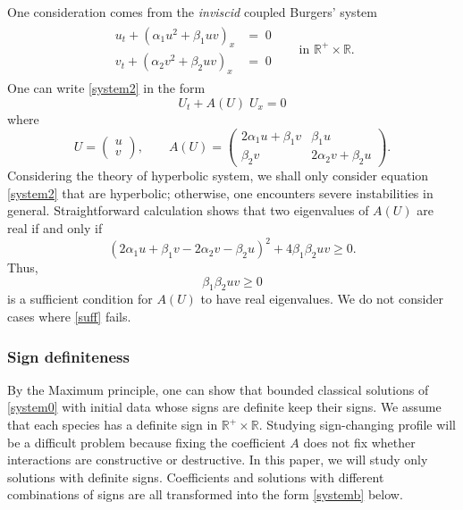 \documentclass{amsart}
\theoremstyle{definition}
\numberwithin{equation}{section}
\begin{document}
One consideration comes from the {\it inviscid} coupled Burgers' system
\begin{align}\label{system2} 
\begin{aligned}
u_{t} + ( \alpha_{1}u^{2} + \beta_{1}uv )_{x} &= \; 0 \\
v_{t} + ( \alpha_{2}v^{2} + \beta_{2}uv )_{x} &= \; 0 
\end{aligned} \quad &\text{in $\mathbb{R}^+\times \mathbb{R}$}.
\end{align}
One can write \eqref{system2} in the form
\begin{equation*}%
U_{t} +
A(U) \; U_{x}=0
\end{equation*}
where
\begin{equation*}
U = \begin{pmatrix}
u \\
v
\end{pmatrix}, \quad \quad
A(U) =
\begin{pmatrix}
2\alpha_{1}u+\beta_{1}v & \beta_{1}u \\
\beta_{2}v & 2\alpha_{2}v + \beta_{2}u
\end{pmatrix}.
\end{equation*}
Considering the theory of hyperbolic system, we shall only consider equation \eqref{system2} that are hyperbolic; otherwise, one encounters severe instabilities in general. Straightforward calculation shows that two eigenvalues of $A(U)$ are real if and only if
$$ (2\alpha_1u + \beta_1v - 2\alpha_2v - \beta_2u)^2 + 4 \beta_1\beta_2uv \ge 0.$$
Thus, 
\begin{equation} \label{suff} \tag{S}
\beta_1\beta_2uv \ge 0 
\end{equation}
is a sufficient condition for $A(U)$ to have real eigenvalues. We do not consider cases where \eqref{suff} fails.


\subsubsection{Sign definiteness}
By the Maximum principle, one can show that bounded classical solutions of \eqref{system0} with initial data whose signs are definite keep their signs. We assume that each species has a definite sign in $ \mathbb{R}^+\times \mathbb{R}$. Studying sign-changing profile will be a difficult problem because fixing the coefficient $A$ does not fix whether interactions are constructive or destructive. In this paper, we will study only solutions with definite signs. %
Coefficients and solutions with different combinations of signs are all transformed into the form \eqref{systemb} below.
\end{document}
